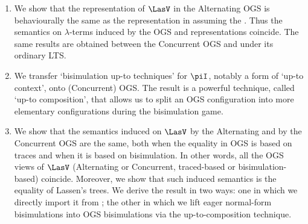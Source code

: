 \begin{enumerate}
\item
We show that
the representation of $\LasV$ in the Alternating 
  OGS  is behaviourally the same as the representation in \piI assuming the \opLTS.
Thus the semantics on $\lambda$-terms induced by the OGS and \piI representations
coincide. 
 The same results are obtained between the Concurrent  OGS and \piI under  its ordinary
 LTS. 


\item 
We   transfer 
 `bisimulation up-to techniques' for  $\piI$, notably a form of `up-to context',
 onto  (Concurrent) OGS.
The result is a powerful technique, called `up-to composition', that allows us to split an OGS
configuration into more elementary configurations during the bisimulation game. 


\item
We show that the semantics induced on $\LasV$ by the Alternating 
and by the Concurrent OGS
are the same, both when the equality in OGS is  based  on traces and
when it is based on bisimulation. 
In other words, all the OGS views of $\LasV$
(Alternating or Concurrent, traced-based or bisimulation-based) coincide. 
Moreover,  we show 
that 
 such
induced semantics is the equality of 
Lassen's trees. We derive the result in two ways:
one  in which we  directly import it from \piI; the other
in which we lift eager normal-form bisimulations into  OGS bisimulations via the up-to-composition technique. 



\end{enumerate}
